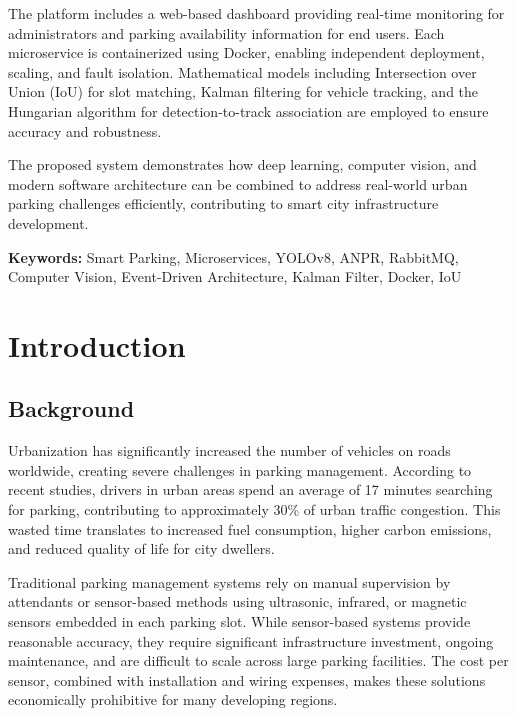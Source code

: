 \documentclass[12pt,a4paper]{report}
\begin{document}
The platform includes a web-based dashboard providing real-time monitoring for administrators and parking availability information for end users. Each microservice is containerized using Docker, enabling independent deployment, scaling, and fault isolation. Mathematical models including Intersection over Union (IoU) for slot matching, Kalman filtering for vehicle tracking, and the Hungarian algorithm for detection-to-track association are employed to ensure accuracy and robustness.

The proposed system demonstrates how deep learning, computer vision, and modern software architecture can be combined to address real-world urban parking challenges efficiently, contributing to smart city infrastructure development.

\vspace{1cm}
\noindent\textbf{Keywords:} Smart Parking, Microservices, YOLOv8, ANPR, RabbitMQ, Computer Vision, Event-Driven Architecture, Kalman Filter, Docker, IoU

\newpage

\tableofcontents
\newpage
\listoffigures
\newpage
\listoftables
\newpage

\chapter{Introduction}

\section{Background}

Urbanization has significantly increased the number of vehicles on roads worldwide, creating severe challenges in parking management. According to recent studies, drivers in urban areas spend an average of 17 minutes searching for parking, contributing to approximately 30\% of urban traffic congestion. This wasted time translates to increased fuel consumption, higher carbon emissions, and reduced quality of life for city dwellers.

Traditional parking management systems rely on manual supervision by attendants or sensor-based methods using ultrasonic, infrared, or magnetic sensors embedded in each parking slot. While sensor-based systems provide reasonable accuracy, they require significant infrastructure investment, ongoing maintenance, and are difficult to scale across large parking facilities. The cost per sensor, combined with installation and wiring expenses, makes these solutions economically prohibitive for many developing regions.
\end{document}
